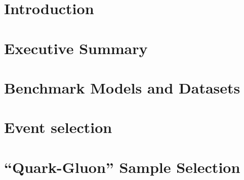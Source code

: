 \documentclass[NOTE, atlasdraft=true, texlive=2016, UKenglish]{atlasdoc}
\begin{document}
\maketitle

\tableofcontents

\clearpage

\section{Introduction}

\clearpage

\section{Executive Summary}

\clearpage

\section{Benchmark Models and Datasets}

\clearpage

\section{Event selection}
\label{sec:event_selection}

\clearpage


\section{``Quark-Gluon'' Sample Selection}

\clearpage
\end{document}
